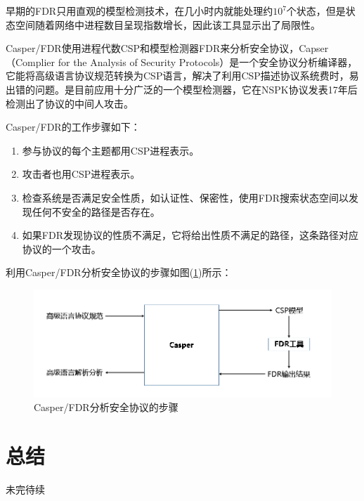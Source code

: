 \documentclass[cs4size,a4pape,UTF8]{ctexart}
\numberwithin{equation}{section}
\numberwithin{table}{section}
\numberwithin{figure}{section}
\begin{document}
早期的FDR只用直观的模型检测技术，在几小时内就能处理约$10^{7}$个状态，但是状态空间随着网络中进程数目呈现指数增长，因此该工具显示出了局限性。

Casper/FDR使用进程代数CSP和模型检测器FDR来分析安全协议，Capser（Complier for the Analysis of Security Protocols）是一个安全协议分析编译器，它能将高级语言协议规范转换为CSP语言，解决了利用CSP描述协议系统费时，易出错的问题。是目前应用十分广泛的一个模型检测器，它在NSPK协议发表17年后检测出了协议的中间人攻击。

Casper/FDR的工作步骤如下：

\begin{enumerate}[(1)]
\item 参与协议的每个主题都用CSP进程表示。
\item 攻击者也用CSP进程表示。
\item 检查系统是否满足安全性质，如认证性、保密性，使用FDR搜索状态空间以发现任何不安全的路径是否存在。
\item 如果FDR发现协议的性质不满足，它将给出性质不满足的路径，这条路径对应协议的一个攻击\cite{1}。
\end{enumerate}

利用Casper/FDR分析安全协议的步骤如图(\ref{fig:4})所示：

\begin{figure}[h!]
\centering
\includegraphics[width=0.8\linewidth]{figure/4}
\caption{Casper/FDR分析安全协议的步骤\cite{1}}
\label{fig:4}
\end{figure}


\section{总结}
未完待续

\clearpage
\end{document}
